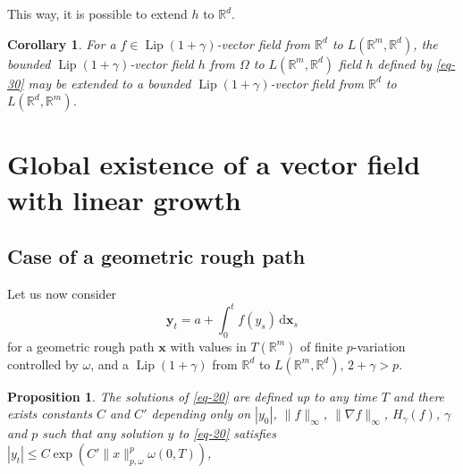 \documentclass[a4paper,12pt]{article}
\newtheorem{corollary}[theorem]{Corollary}
\newtheorem{proposition}[theorem]{Proposition}
\theoremstyle{definition}
\newcommand{\vd}{\,\mathrm{d}}
\newcommand{\bx}{\mathbf{x}}
\newcommand{\by}{\mathbf{y}}
\newcommand{\RR}{\mathbb{R}}
\DeclareMathOperator{\Lip}{Lip}
\begin{document}
This way, it is possible to extend $h$ to $\RR^d$. 

\begin{corollary}
\label{cor-1}
For a $f\in \Lip(1+\gamma)$-vector field from $\RR^d$ to $L(\RR^m,\RR^d)$,
the bounded $\Lip(1+\gamma)$-vector field $h$ from  $\Omega$ to $L(\RR^m,\RR^d)$ field $h$ defined by \eqref{eq-30} may be extended
to a bounded $\Lip(1+\gamma)$-vector field from $\RR^d$ to $L(\RR^d,\RR^m)$.
\end{corollary}



\section{Global existence of a vector field with linear growth}
\label{sec:global}
\subsection{Case of a geometric rough path}

Let us now consider 
\begin{equation}
\label{eq-20}
\by_t=a+\int_0^t f(y_s)\vd \bx_s
\end{equation}
for a geometric rough path $\bx$ with values in $T(\RR^m)$ of finite $p$-variation 
controlled by $\omega$, and a $\Lip(1+\gamma)$ from $\RR^d$ to $L(\RR^m,\RR^d)$,
$2+\gamma>p$.

\begin{proposition}
\label{prop-2}
The solutions of \eqref{eq-20} are defined up to any time $T$ and there exists constants $C$
and $C'$ depending only on $|y_0|$, $\|f\|_{\infty}$, $\|\nabla f\|_{\infty}$, $H_\gamma(f)$, $\gamma$ 
and $p$ such that any solution $y$
to \eqref{eq-20} satisfies $|y_t|\leq C\exp(C'\|x\|_{p,\omega}^p\omega(0,T))$, 
\end{proposition}
\end{document}
